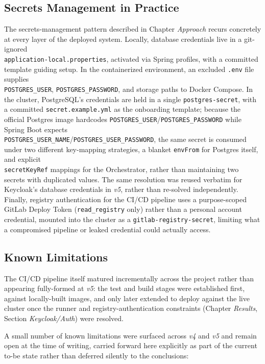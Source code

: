 \documentclass[twoside]{supsistudent}
\begin{document}
\subsection{Secrets Management in Practice}
The secrets-management pattern described in Chapter \emph{Approach} recurs concretely at every layer of the deployed system. Locally, database credentials live in a git-ignored \\ \texttt{application-local.properties}, activated via Spring profiles, with a committed template guiding setup. In the containerized environment, an excluded \texttt{.env} file supplies \\ \texttt{POSTGRES\_USER}, \texttt{POSTGRES\_PASSWORD}, and storage paths to Docker Compose. In the cluster, PostgreSQL's credentials are held in a single \texttt{postgres-secret}, with a committed \texttt{secret.example.yml} as the onboarding template; because the official Postgres image hardcodes \texttt{POSTGRES\_USER}/\texttt{POSTGRES\_PASSWORD} while Spring Boot expects \\ \texttt{POSTGRES\_USER\_NAME}/\texttt{POSTGRES\_USER\_PASSWORD}, the same secret is consumed under two different key-mapping strategies, a blanket \texttt{envFrom} for Postgres itself, and explicit \\ \texttt{secretKeyRef} mappings for the Orchestrator, rather than maintaining two secrets with duplicated values. The same resolution was reused verbatim for Keycloak's database credentials in \emph{v5}, rather than re-solved independently. Finally, registry authentication for the CI/CD pipeline uses a purpose-scoped GitLab Deploy Token (\texttt{read\_registry} only) rather than a personal account credential, mounted into the cluster as a \texttt{gitlab-registry-secret}, limiting what a compromised pipeline or leaked credential could actually access.

\subsection{Known Limitations}
The CI/CD pipeline itself matured incrementally across the project rather than appearing fully-formed at \emph{v5}: the test and build stages were established first, against locally-built images, and only later extended to deploy against the live cluster once the runner and registry-authentication constraints (Chapter \emph{Results}, Section \emph{Keycloak/Auth}) were resolved.

A small number of known limitations were surfaced across \emph{v4} and \emph{v5} and remain open at the time of writing, carried forward here explicitly as part of the current to-be state rather than deferred silently to the conclusions:
\end{document}
